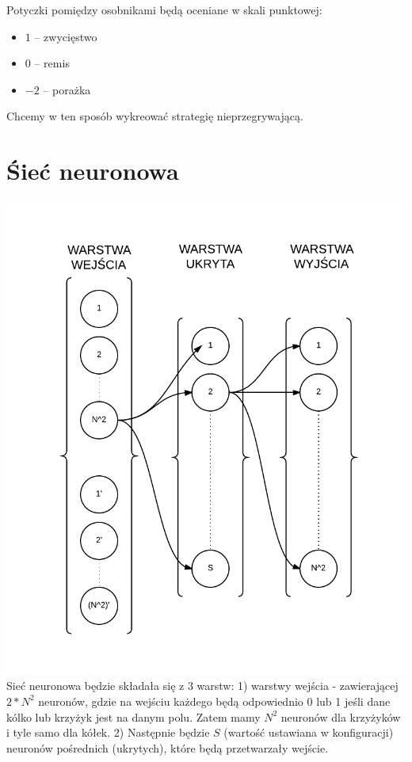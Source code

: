 \documentclass[paper=a4, fontsize=11pt]{scrartcl} %
\numberwithin{equation}{section} %
\numberwithin{figure}{section} %
\numberwithin{table}{section} %
\begin{document}
Potyczki pomiędzy osobnikami będą oceniane w skali punktowej: \\
\begin{itemize}
	\item $1$ -- zwycięstwo
	\item $0$ -- remis
	\item $-2$ -- porażka
\end{itemize}
Chcemy w ten sposób wykreować strategię nieprzegrywającą. \\

\section{Śieć neuronowa}
\includegraphics[scale=1]{diagrams/CoevolutionaryTicTacToe}
Sieć neuronowa będzie składała się z 3 warstw:
1) warstwy wejścia - zawierającej $2*N^2$ neuronów, gdzie na wejściu każdego będą odpowiednio 0 lub 1 jeśli dane kólko lub krzyżyk jest na danym polu. Zatem mamy $N^2$ neuronów dla krzyżyków i tyle samo dla kółek.
2) Następnie będzie $S$ (wartość ustawiana w konfiguracji) neuronów pośrednich (ukrytych), które będą przetwarzały wejście.
\end{document}
